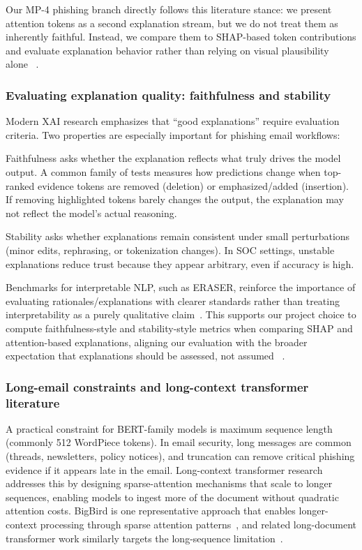 \documentclass[conference]{IEEEtran}
\begin{document}
Our MP-4 phishing branch directly follows this literature stance: we present attention tokens as a second explanation stream, but we do not treat them as inherently faithful. Instead, we compare them to SHAP-based token contributions and evaluate explanation behavior rather than relying on visual plausibility alone~\cite{LL2017} \cite{JW2019} \cite{SY2019}.

\subsubsection{Evaluating explanation quality: faithfulness and stability}

Modern XAI research emphasizes that “good explanations” require evaluation criteria. Two properties are especially important for phishing email workflows:

Faithfulness asks whether the explanation reflects what truly drives the model output. A common family of tests measures how predictions change when top-ranked evidence tokens are removed (deletion) or emphasized/added (insertion). If removing highlighted tokens barely changes the output, the explanation may not reflect the model’s actual reasoning.

Stability asks whether explanations remain consistent under small perturbations (minor edits, rephrasing, or tokenization changes). In SOC settings, unstable explanations reduce trust because they appear arbitrary, even if accuracy is high.

Benchmarks for interpretable NLP, such as ERASER, reinforce the importance of evaluating rationales/explanations with clearer standards rather than treating interpretability as a purely qualitative claim~\cite{DJRLXSWB2020}. This supports our project choice to compute faithfulness-style and stability-style metrics when comparing SHAP and attention-based explanations, aligning our evaluation with the broader expectation that explanations should be assessed, not assumed~\cite{JW2019} \cite{DJRLXSWB2020}.

\subsubsection{Long-email constraints and long-context transformer literature}

A practical constraint for BERT-family models is maximum sequence length (commonly 512 WordPiece tokens). In email security, long messages are common (threads, newsletters, policy notices), and truncation can remove critical phishing evidence if it appears late in the email. Long-context transformer research addresses this by designing sparse-attention mechanisms that scale to longer sequences, enabling models to ingest more of the document without quadratic attention costs. BigBird is one representative approach that enables longer-context processing through sparse attention patterns~\cite{ZGDAA2020}, and related long-document transformer work similarly targets the long-sequence limitation~\cite{IMA2020}.
\end{document}
